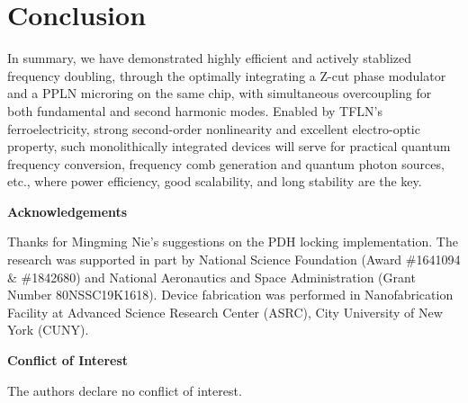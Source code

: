 \documentclass{WileyMSP-template}
\begin{document}
\section{Conclusion}
In summary, we have demonstrated highly efficient and actively stablized frequency doubling, through the optimally integrating a Z-cut phase modulator and a PPLN microring on the same chip, with simultaneous overcoupling for both fundamental and second harmonic modes. Enabled by TFLN's ferroelectricity, strong second-order nonlinearity and excellent electro-optic property, such monolithically integrated devices will serve for practical quantum frequency conversion, frequency comb generation and quantum photon sources, etc., where power efficiency, good scalability, and long stability are the key.

\newpage




\medskip
\textbf{Acknowledgements} \par %
Thanks for Mingming Nie's suggestions on the PDH locking implementation. The research was supported in part by National Science Foundation (Award \#1641094 \& \#1842680) and National Aeronautics and Space Administration (Grant Number 80NSSC19K1618). Device fabrication was performed in Nanofabrication Facility at Advanced Science Research Center (ASRC), City University of New York (CUNY).

\medskip
\textbf{Conflict of Interest} \par 
The authors declare no conflict of interest.




\medskip

%
%
\end{document}
